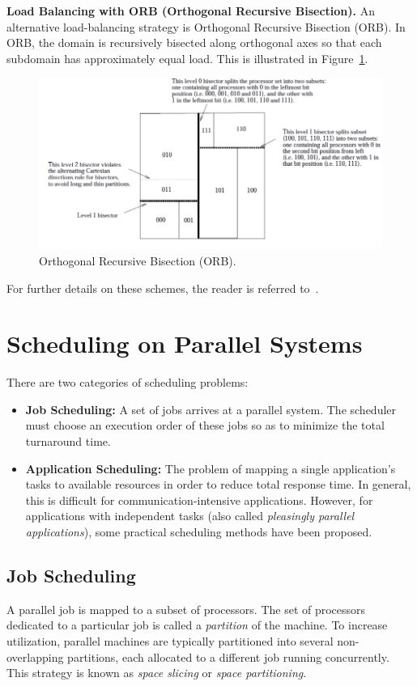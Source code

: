 \documentclass[12pt]{book}
\begin{document}
\textbf{Load Balancing with ORB (Orthogonal Recursive Bisection).}  
An alternative load-balancing strategy is Orthogonal Recursive Bisection (ORB). In ORB, the domain is recursively bisected along orthogonal axes so that each subdomain has approximately equal load. This is illustrated in Figure~\ref{fig:ORB}.

\begin{figure}[H]
    \centering
    \includegraphics[width=0.75\linewidth]{images/ORB.png}
    \caption{Orthogonal Recursive Bisection (ORB).}
    \label{fig:ORB}
\end{figure}

For further details on these schemes, the reader is referred to~\cite{grama1994scalable,singh1995load}.


\section{Scheduling on Parallel Systems}
There are two categories of scheduling problems:
\begin{itemize}
    \item \textbf{Job Scheduling:} A set of jobs arrives at a parallel system. The scheduler must choose an execution order of these jobs so as to minimize the total turnaround time.
    \item \textbf{Application Scheduling:} The problem of mapping a single application's tasks to available resources in order to reduce total response time. In general, this is difficult for communication-intensive applications. However, for applications with independent tasks (also called \emph{pleasingly parallel applications}), some practical scheduling methods have been proposed.
\end{itemize}

\subsection{Job Scheduling}
A parallel job is mapped to a subset of processors. The set of processors dedicated to a particular job is called a \emph{partition} of the machine. To increase utilization, parallel machines are typically partitioned into several non-overlapping partitions, each allocated to a different job running concurrently. This strategy is known as \emph{space slicing} or \emph{space partitioning}.
\end{document}
